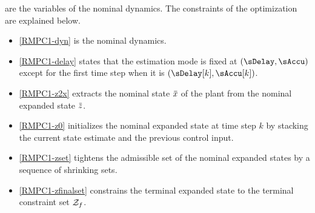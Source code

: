 are the variables of the nominal dynamics. The constraints of the
optimization are explained below.
\begin{itemize}
\item \eqref{RMPC1-dyn} is the nominal dynamics.
\item \eqref{RMPC1-delay} states that the estimation mode is fixed at $\left(\sDelay,\sAccu\right)$
except for the first time step when it is $\left(\sDelay[k],\sAccu[k]\right)$.
\item \eqref{RMPC1-z2x} extracts the nominal state $\Nom x$ of the plant
from the nominal expanded state $\Nom z$.
\item \eqref{RMPC1-z0} initializes the nominal expanded state at time step
$k$ by stacking the current state estimate and the previous control
input.
\item \eqref{RMPC1-zset} tightens the admissible set of the nominal expanded
states by a sequence of shrinking sets.
\item \eqref{RMPC1-zfinalset} constrains the terminal expanded state to
the terminal constraint set $\mathcal{Z}_{f}$.
\end{itemize}

